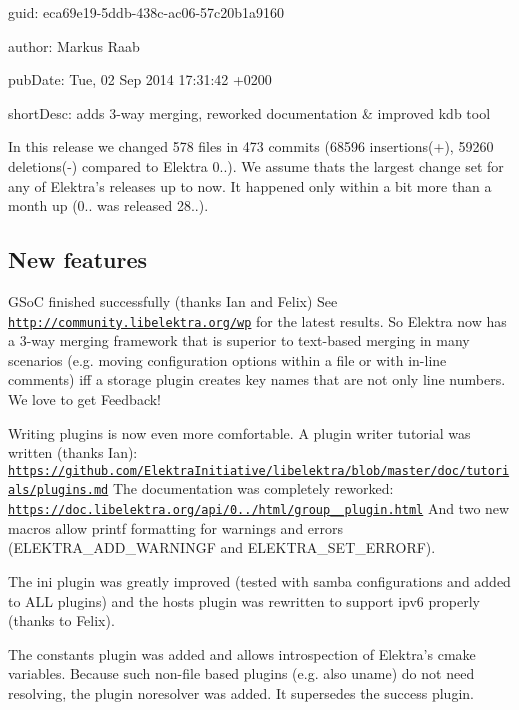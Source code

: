 
\begin{DoxyItemize}
\item guid\+: eca69e19-\/5ddb-\/438c-\/ac06-\/57c20b1a9160
\item author\+: Markus Raab
\item pub\+Date\+: Tue, 02 Sep 2014 17\+:31\+:42 +0200
\item short\+Desc\+: adds 3-\/way merging, reworked documentation \& improved kdb tool
\end{DoxyItemize}

In this release we changed 578 files in 473 commits (68596 insertions(+), 59260 deletions(-\/) compared to Elektra 0..). We assume thats the largest change set for any of Elektra’s releases up to now. It happened only within a bit more than a month up (0.. was released 28..).

\subsection*{New features}

G\+SoC finished successfully (thanks Ian and Felix) See \href{http://community.libelektra.org/wp}{\tt http\+://community.\+libelektra.\+org/wp} for the latest results. So Elektra now has a 3-\/way merging framework that is superior to text-\/based merging in many scenarios (e.\+g. moving configuration options within a file or with in-\/line comments) iff a storage plugin creates key names that are not only line numbers. We love to get Feedback!

Writing plugins is now even more comfortable. A plugin writer tutorial was written (thanks Ian)\+: \href{https://github.com/ElektraInitiative/libelektra/blob/master/doc/tutorials/plugins.md}{\tt https\+://github.\+com/\+Elektra\+Initiative/libelektra/blob/master/doc/tutorials/plugins.\+md} The documentation was completely reworked\+: \href{https://doc.libelektra.org/api/0.8.7/html/group__plugin.html}{\tt https\+://doc.\+libelektra.\+org/api/0../html/group\+\_\+\+\_\+plugin.\+html} And two new macros allow printf formatting for warnings and errors ({\ttfamily E\+L\+E\+K\+T\+R\+A\+\_\+\+A\+D\+D\+\_\+\+W\+A\+R\+N\+I\+N\+GF} and {\ttfamily E\+L\+E\+K\+T\+R\+A\+\_\+\+S\+E\+T\+\_\+\+E\+R\+R\+O\+RF}).

The ini plugin was greatly improved (tested with samba configurations and added to A\+LL plugins) and the hosts plugin was rewritten to support ipv6 properly (thanks to Felix).

The constants plugin was added and allows introspection of Elektra’s cmake variables. Because such non-\/file based plugins (e.\+g. also uname) do not need resolving, the plugin noresolver was added. It supersedes the success plugin.

